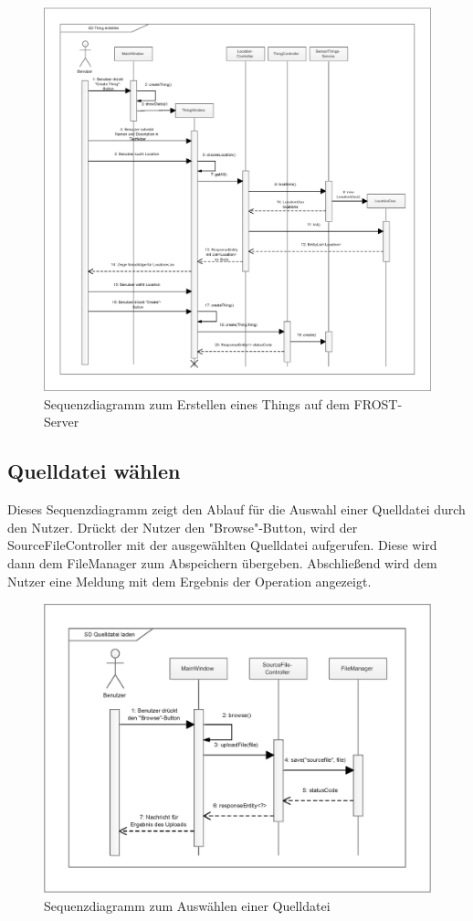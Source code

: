 \vspace{\fill}

\begin{figure}[htbp]
\centering
\includegraphics[scale=0.52]{uml/SD_createThing.eps}
\caption{Sequenzdiagramm zum Erstellen eines Things auf dem FROST-Server}
\end{figure}

\vspace{\fill}
\clearpage
\subsection{Quelldatei wählen}
Dieses Sequenzdiagramm zeigt den Ablauf für die Auswahl einer Quelldatei durch den Nutzer.
Drückt der Nutzer den "{Browse}"{-Button}, wird der SourceFileController mit der ausgewählten Quelldatei aufgerufen.
Diese wird dann dem FileManager zum Abspeichern übergeben.
Abschließend wird dem Nutzer eine Meldung mit dem Ergebnis der Operation angezeigt.

\vspace{\fill}
\begin{figure}[htbp]
\centering
\includegraphics[scale=0.7]{uml/SD_sourceFile.eps}
\caption{Sequenzdiagramm zum Auswählen einer Quelldatei}
\end{figure}

\vspace{\fill}
